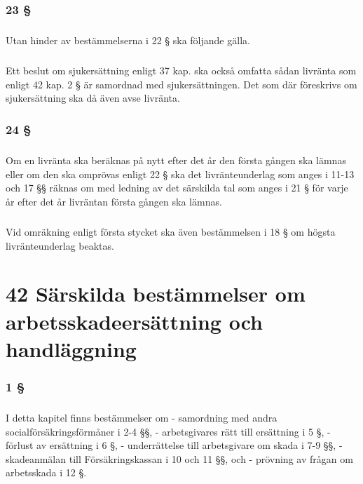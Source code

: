 \documentclass[a4paper,notitlepage,openany,10pt]{book}
\begin{document}
\subsection*{23 §}
\paragraph*{}
Utan hinder av bestämmelserna i 22 § ska följande gälla.
\paragraph*{}
Ett beslut om sjukersättning enligt 37 kap. ska också omfatta sådan livränta som enligt 42 kap. 2 § är samordnad med sjukersättningen. Det som där föreskrivs om sjukersättning ska då även avse livränta.
\subsection*{24 §}
\paragraph*{}
Om en livränta ska beräknas på nytt efter det år den första gången ska lämnas eller om den ska omprövas enligt 22 § ska det livränteunderlag som anges i 11-13 och 17 §§ räknas om med ledning av det särskilda tal som anges i 21 § för varje år efter det år livräntan första gången ska lämnas.
\paragraph*{}
Vid omräkning enligt första stycket ska även bestämmelsen i 18 § om högsta livränteunderlag beaktas.
\chapter*{42 Särskilda bestämmelser om arbetsskadeersättning och handläggning}
\subsection*{1 §}
\paragraph*{}
I detta kapitel finns bestämmelser om
\newline - samordning med andra socialförsäkringsförmåner i 2-4 §§,
\newline - arbetsgivares rätt till ersättning i 5 §,
\newline - förlust av ersättning i 6 §,
\newline - underrättelse till arbetsgivare om skada i 7-9 §§,
\newline - skadeanmälan till Försäkringskassan i 10 och 11 §§, och
\newline - prövning av frågan om arbetsskada i 12 §.
\end{document}
